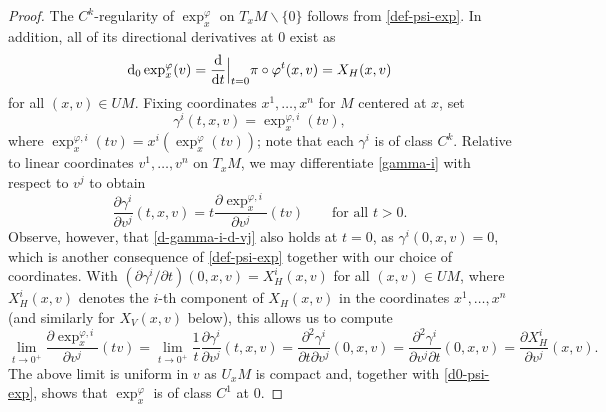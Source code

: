 \documentclass[10pt,a4paper]{amsart}
\numberwithin{equation}{section}
\theoremstyle{definition}
\begin{document}
\begin{proof}
 The $C^k$-regularity of $\exp^{\varphi}_x$ on $T_xM \smallsetminus \{0\}$ follows from \eqref{def-psi-exp}. In addition, all of its directional derivatives at $0$ exist as
 \begin{equation}\label{d0-psi-exp} {\rm d}_0\exp_x^{\varphi}(v) = \frac{\rm d}{{\rm d}t} \Big|_{t=0} \pi \circ \varphi^t(x,v) = X_H(x,v)\end{equation}for all $(x,v)\in UM$. Fixing coordinates $x^1, \ldots, x^n$ for $M$ centered at $x$, set
 \begin{equation}\label{gamma-i}
 \gamma^i(t,x,v) = \exp_x^{\varphi, i}(tv),
 \end{equation}where $\exp_x^{\varphi, i}(tv) = x^i(\exp_x^{\varphi}(tv))$; note that each $\gamma^i$ is of class $C^k$. Relative to linear coordinates $v^1,\ldots, v^n$ on $T_xM$, we may differentiate \eqref{gamma-i} with respect to $v^j$ to obtain
 \begin{equation}\label{d-gamma-i-d-vj}
 \frac{\partial \gamma^i}{\partial v^j}(t,x,v) =t \frac{\partial \exp_x^{\varphi,i}}{\partial v^j}(tv) \qquad\mbox{for all }t>0.
 \end{equation}Observe, however, that \eqref{d-gamma-i-d-vj} also holds at $t=0$, as $\gamma^i(0,x,v) = 0$, which is another consequence of \eqref{def-psi-exp} together with our choice of coordinates. With $(\partial \gamma^i/\partial t)(0,x,v) = X_H^i(x,v)$ for all $(x,v)\in UM$, where $X_H^i(x,v)$ denotes the $i$-th component of $X_H(x,v)$ in the coordinates $x^1,\ldots, x^n$ (and similarly for $X_V(x,v)$ below), this allows us to compute
 \begin{equation*}
\lim_{t\to 0^+} \frac{\partial \exp_x^{\varphi, i}}{\partial v^j}(tv) = \lim_{t\to 0^+} \frac{1}{t} \frac{\partial \gamma^i}{\partial v^j}(t,x,v) = \frac{\partial^2 \gamma^i}{\partial t \partial v^j}(0,x,v) = \frac{\partial^2 \gamma^i}{\partial v^j \partial t}(0,x,v) = \frac{\partial X_H^i}{\partial v^j}(x,v).
 \end{equation*}
The above limit is uniform in $v$ as $U_xM$ is compact and, together with \eqref{d0-psi-exp}, shows that $\exp_x^{\varphi}$ is of class $C^1$ at $0$.


\end{proof}
\end{document}
